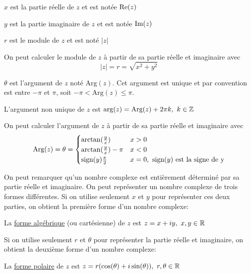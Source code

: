\begin{definition}
    $x$ est la partie réelle de $z$ et est notée $\text{Re}(z)$
\end{definition}
\begin{definition}
    $y$ est la partie imaginaire de $z$ et est notée $\text{Im}(z)$
\end{definition}
\begin{definition}
    $r$ est le module de $z$ et est noté $|z|$
\end{definition}
\begin{lemma} On peut calculer le module de $z$ à partir de sa partie réelle et imaginaire avec
    \[|z| = r = \sqrt{x^2 + y^2}\]
\end{lemma}
\begin{definition}
    $\theta$ est l'argument de $z$ noté $\text{Arg}(z)$. Cet argument est unique et par convention est entre $-\pi$ et $\pi$, soit $-\pi < \text{Arg}(z) \leq \pi$.
\end{definition}
\begin{definition}
    L'argument non unique de $z$ est $\arg(z) = \text{Arg}(z) + 2\pi k, \ k \in \mathbb{Z}$
\end{definition}
\begin{lemma}
    On peut calculer l'argument de $z$ à partir de sa partie réelle et imaginaire avec
    \[\textup{Arg}(z) = \theta =
        \begin{cases}
            \arctan(\frac{y}{x})          & x > 0                                                  \\
            \arctan(\frac{y}{x}) - \pi    & x < 0                                                  \\
            \textup{sign}(y)\frac{\pi}{2} & x = 0, \ \textup{sign}(y) \ \textup{est la signe de y}
        \end{cases}\]
\end{lemma}
On peut remarquer qu'un nombre complexe est entièrement déterminé par sa partie réelle et imaginaire. On peut représenter un nombre complexe de trois formes différentes. Si on utilise seulement $x$ et $y$ pour représenter ces deux parties, on obtient la première forme d'un nombre complexe:
\begin{definition}
    La \underline{forme algébrique} (ou cartésienne) de $z$ est $z = x + iy, \ x, y \in \mathbb{R}$
\end{definition}
Si on utilise seulement $r$ et $\theta$ pour représenter la partie réelle et imaginaire, on obtient la deuxième forme d'un nombre complexe:
\begin{definition}
    La \underline{forme polaire} de $z$ est $z = r(\cos(\theta)+i\sin(\theta)), \ r, \theta \in \mathbb{R}$
\end{definition}
